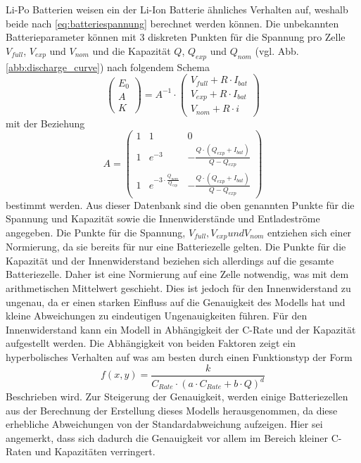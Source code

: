 Li-Po Batterien weisen ein der Li-Ion Batterie ähnliches Verhalten auf, weshalb beide nach \ref{eq:batteriespannung} berechnet werden können. Die unbekannten Batterieparameter können mit 3 diskreten Punkten für die Spannung pro Zelle \ensuremath{V_{full}}, \ensuremath{V_{exp}} und  \ensuremath{V_{nom}} und die Kapazität \ensuremath{Q}, \ensuremath{Q_{exp}} und \ensuremath{Q_{nom}} (vgl. Abb.\ref{abb:discharge_curve}) nach folgendem Schema
\begin{equation}
	\begin{pmatrix} E_0 \\ A \\ K \end{pmatrix} = A^{-1}\cdot \begin{pmatrix}
	V_{full}+R\cdot I_{bat} \\ V_{exp}+R\cdot I_{bat} \\ V_{nom}+R\cdot i \end{pmatrix}
\end{equation}
mit der Beziehung
\begin{equation}
	A = \begin{pmatrix}
	1 & 1 & 0 \\ 1 & e^{-3} & -\frac{Q\cdot (Q_{exp}+I_{bat})}{Q-Q_{exp}} \\ 1 & e^{-3\cdot\frac{Q_{nom}}{Q_{exp}}} & -\frac{Q\cdot (Q_{exp}+I_{bat})}{Q-Q_{exp}}
	\end{pmatrix}
\end{equation}
bestimmt werden.
Aus dieser Datenbank sind die oben genannten Punkte für die Spannung und Kapazität sowie die Innenwiderstände und Entladeströme angegeben. Die Punkte für die Spannung, $V_{full}, V_{exp} und V_{nom}$ entziehen sich einer Normierung, da sie bereits für nur eine Batteriezelle gelten. Die Punkte für die Kapazität und der Innenwiderstand beziehen sich allerdings auf die gesamte Batteriezelle. Daher ist eine Normierung auf eine Zelle notwendig, was mit dem arithmetischen Mittelwert geschieht. Dies ist jedoch für den Innenwiderstand zu ungenau, da er einen starken Einfluss auf die Genauigkeit des Modells hat und kleine Abweichungen zu eindeutigen Ungenauigkeiten führen. Für den Innenwiderstand kann ein Modell in Abhängigkeit der C-Rate und der Kapazität aufgestellt werden.  Die Abhängigkeit von beiden Faktoren zeigt ein hyperbolisches Verhalten auf was am besten durch einen Funktionstyp der Form 
\begin{equation}
	f(x,y) = \frac{k}{C_{Rate}\cdot(a\cdot C_{Rate}+b\cdot Q)^d}
\end{equation}
Beschrieben wird. Zur Steigerung der Genauigkeit, werden einige Batteriezellen aus der Berechnung der Erstellung dieses Modells herausgenommen, da diese erhebliche Abweichungen von der Standardabweichung aufzeigen. Hier sei angemerkt, dass sich dadurch die Genauigkeit vor allem  im Bereich kleiner C-Raten und Kapazitäten verringert.




